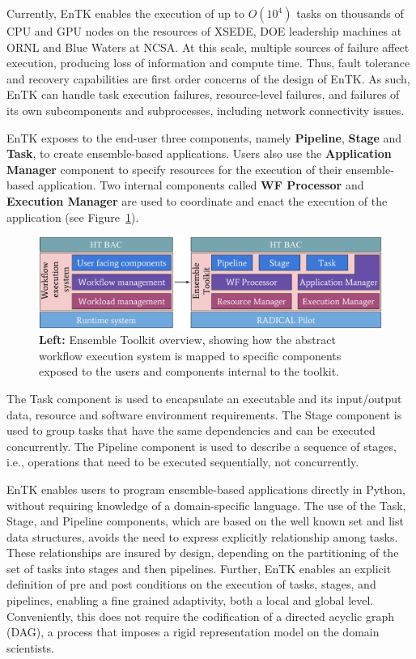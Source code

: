 Currently, EnTK enables the execution of up to \(O(10^4)\) tasks on thousands
of CPU and GPU nodes on the resources of XSEDE, DOE leadership machines
at ORNL and Blue Waters at NCSA. At this scale, multiple sources of failure
affect execution, producing loss of information and compute time. Thus, fault
tolerance and recovery capabilities are first order concerns of the design of
EnTK\@. As such, EnTK can handle task execution failures, resource-level
failures, and failures of its own subcomponents and subprocesses, including
network connectivity issues.

EnTK exposes to the end-user three components, namely \textbf{Pipeline},
\textbf{Stage} and \textbf{Task}, to create ensemble-based applications. Users
also use the \textbf{Application Manager} component to specify resources for
the execution of their ensemble-based application. Two internal components
called \textbf{WF Processor} and \textbf{Execution Manager} are used
to coordinate and enact the execution of the application (see
Figure~\ref{fig:entk_arch}).

\begin{figure}
  \centering
  \includegraphics[width=\columnwidth]{FIGURES/entk_overview.pdf}
  \caption{\textbf{Left:} Ensemble Toolkit overview, showing how the abstract
           workflow execution system is mapped to specific components exposed
           to the users and components internal to the
           toolkit.}\label{fig:entk_arch}
\end{figure}

The Task component is used to encapsulate an executable  and its input/output
data, resource and software environment requirements. The Stage component is
used to group tasks that have the same dependencies and can be executed
concurrently. The Pipeline component is used to describe a sequence of
stages, i.e., operations that need to be executed sequentially, not concurrently.

EnTK enables users to program ensemble-based applications directly in Python,
without requiring knowledge of a domain-specific language. The use of the
Task, Stage, and Pipeline components, which are based on the well known set
and list data structures, avoids the need to express explicitly relationship
among tasks. These relationships are insured by design, depending on the
partitioning of the set of tasks into stages and then pipelines. Further,
EnTK enables an explicit definition of pre and post conditions on the
execution of tasks, stages, and pipelines, enabling a fine grained
adaptivity, both a local and global level. Conveniently, this does not
require the codification of a directed acyclic graph (DAG), a process that imposes a rigid
representation model on the domain scientists.

